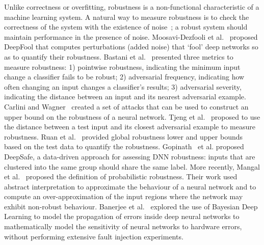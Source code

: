 \label{sec:robustness}

Unlike correctness or overfitting, robustness is a non-functional characteristic of a machine learning system.
A natural way to measure robustness is to check the correctness of the system with the existence of noise~; a robust system should maintain performance in the presence of noise.
Moosavi-Dezfooli et al.~ proposed DeepFool that computes perturbations (added noise) that `fool' deep networks so as to quantify their robustness.
Bastani et al.~ presented three metrics to measure robustness: 
1) pointwise robustness, indicating the minimum input change a classifier fails to be robust;
2) adversarial frequency, indicating how often changing an input changes a classifier's results;
3) adversarial severity, indicating the distance between an input and its nearest adversarial example.
Carlini and Wagner~ created a set of attacks that can be used
to construct an upper bound on the robustness of a neural network.
Tjeng et al.~ proposed to use the distance between a test input and its closest adversarial example to measure robustness.
Ruan et al.~ provided global robustness lower and upper bounds based on the test data to quantify the robustness. 
Gopinath~ et al. proposed DeepSafe, a data-driven approach for assessing DNN robustness: inputs that are clustered into the same group should share the same label.
More recently, Mangal et al.~ proposed the definition of probabilistic robustness. 
Their work used abstract interpretation to approximate the behaviour of a neural network and to compute an over-approximation of the input regions where the network may exhibit non-robust behaviour.
Banerjee et al.~ explored the use of Bayesian Deep Learning to model the propagation of errors inside deep neural networks to mathematically model the sensitivity of neural networks to hardware errors, without performing extensive fault injection experiments.

